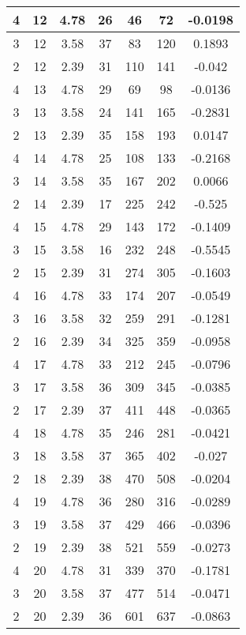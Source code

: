 \documentclass[letterpaper, 12pt]{article}
\begin{document}
\begin{longtable}{|c|c|c|c|c|c|c|}
\hline
4 & 12 & 4.78 & 26 & 46 & 72 & -0.0198 \\
\hline
3 & 12 & 3.58 & 37 & 83 & 120 & 0.1893 \\
\hline
2 & 12 & 2.39 & 31 & 110 & 141 & -0.042 \\
\hline
4 & 13 & 4.78 & 29 & 69 & 98 & -0.0136 \\
\hline
3 & 13 & 3.58 & 24 & 141 & 165 & -0.2831 \\
\hline
2 & 13 & 2.39 & 35 & 158 & 193 & 0.0147 \\
\hline
4 & 14 & 4.78 & 25 & 108 & 133 & -0.2168 \\
\hline
3 & 14 & 3.58 & 35 & 167 & 202 & 0.0066 \\
\hline
2 & 14 & 2.39 & 17 & 225 & 242 & -0.525 \\
\hline
4 & 15 & 4.78 & 29 & 143 & 172 & -0.1409 \\
\hline
3 & 15 & 3.58 & 16 & 232 & 248 & -0.5545 \\
\hline
2 & 15 & 2.39 & 31 & 274 & 305 & -0.1603 \\
\hline
4 & 16 & 4.78 & 33 & 174 & 207 & -0.0549 \\
\hline
3 & 16 & 3.58 & 32 & 259 & 291 & -0.1281 \\
\hline
2 & 16 & 2.39 & 34 & 325 & 359 & -0.0958 \\
\hline
4 & 17 & 4.78 & 33 & 212 & 245 & -0.0796 \\
\hline
3 & 17 & 3.58 & 36 & 309 & 345 & -0.0385 \\
\hline
2 & 17 & 2.39 & 37 & 411 & 448 & -0.0365 \\
\hline
4 & 18 & 4.78 & 35 & 246 & 281 & -0.0421 \\
\hline
3 & 18 & 3.58 & 37 & 365 & 402 & -0.027 \\
\hline
2 & 18 & 2.39 & 38 & 470 & 508 & -0.0204 \\
\hline
4 & 19 & 4.78 & 36 & 280 & 316 & -0.0289 \\
\hline
3 & 19 & 3.58 & 37 & 429 & 466 & -0.0396 \\
\hline
2 & 19 & 2.39 & 38 & 521 & 559 & -0.0273 \\
\hline
4 & 20 & 4.78 & 31 & 339 & 370 & -0.1781 \\
\hline
3 & 20 & 3.58 & 37 & 477 & 514 & -0.0471 \\
\hline
2 & 20 & 2.39 & 36 & 601 & 637 & -0.0863 \\
\hline
\end{longtable}
\end{document}
